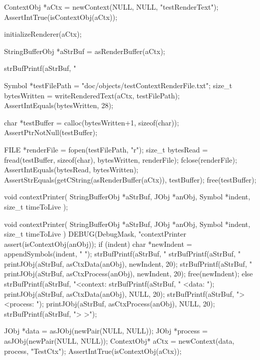 
\startCTest
  ContextObj *aCtx = newContext(NULL, NULL, "testRenderText");
  AssertIntTrue(isContextObj(aCtx));
  
  initializeRenderer(aCtx);
  
  StringBufferObj *aStrBuf = asRenderBuffer(aCtx);
  
  strBufPrintf(aStrBuf, "%
  
  Symbol *testFilePath = "doc/objects/testContextRenderFile.txt";
  size_t bytesWritten  = writeRenderedText(aCtx, testFilePath);
  AssertIntEquals(bytesWritten, 28);
  
  char *testBuffer = calloc(bytesWritten+1, sizeof(char));
  AssertPtrNotNull(testBuffer);
  
  FILE *renderFile = fopen(testFilePath, "r");
  size_t bytesRead = fread(testBuffer, sizeof(char), bytesWritten, renderFile);
  fclose(renderFile);
  AssertIntEquals(bytesRead, bytesWritten);
  AssertStrEquals(getCString(asRenderBuffer(aCtx)), testBuffer);
  free(testBuffer);
\stopCTest
\stopTestCase
\stopTestSuite

\startTestSuite[contextPrinter]

\startCHeader
void contextPrinter(
  StringBufferObj *aStrBuf,
  JObj            *anObj,
  Symbol          *indent,
  size_t           timeToLive
);
\stopCHeader

\startCCode
void contextPrinter(
  StringBufferObj *aStrBuf,
  JObj            *anObj,
  Symbol          *indent,
  size_t           timeToLive
) {
  DEBUG(DebugMask, "contextPrinter %
  assert(isContextObj(anObj));
  if (indent) {
    char *newIndent = appendSymbols(indent, "    ");
    strBufPrintf(aStrBuf, "%
    strBufPrintf(aStrBuf, "%
    printJObj(aStrBuf, asCtxData(anObj), newIndent, 20);
    strBufPrintf(aStrBuf, "%
    printJObj(aStrBuf, asCtxProcess(anObj), newIndent, 20);
    free(newIndent);
  } else {
    strBufPrintf(aStrBuf, "<context:%
    strBufPrintf(aStrBuf, "  <data: ");
    printJObj(aStrBuf, asCtxData(anObj), NULL, 20);
    strBufPrintf(aStrBuf, "> <process: ");
    printJObj(aStrBuf, asCtxProcess(anObj), NULL, 20);
    strBufPrintf(aStrBuf, "> >");
  }
}
\stopCCode


\startCTest
  JObj *data       = asJObj(newPair(NULL, NULL));
  JObj *process    = asJObj(newPair(NULL, NULL));
  ContextObj* aCtx = newContext(data, process, "TestCtx");
  AssertIntTrue(isContextObj(aCtx));
  
